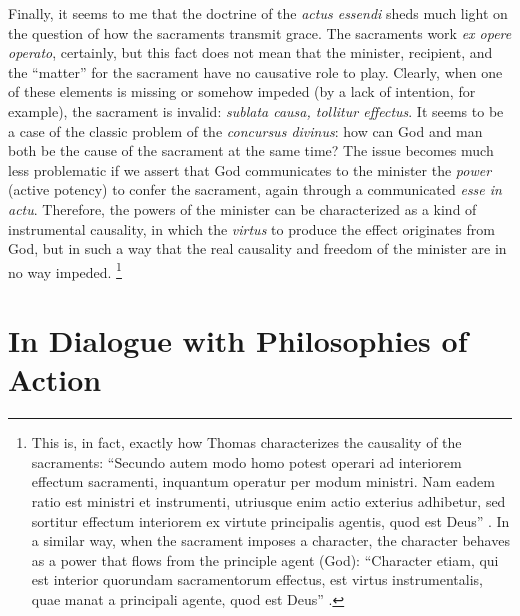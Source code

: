 Finally, it seems to me that the doctrine of the \emph{actus essendi} sheds much light on the question of how the sacraments transmit grace. The sacraments work \emph{ex opere operato}, certainly, but this fact does not mean that the minister, recipient, and the ``matter'' for the sacrament have no causative role to play. Clearly, when one of these elements is missing or somehow impeded (by a lack of intention, for example), the sacrament is invalid: \emph{sublata causa, tollitur effectus}. It seems to be a case of the classic problem of the \emph{concursus divinus}: how can God and man both be the cause of the sacrament at the same time? The issue becomes much less problematic if we assert that God communicates to the minister the \emph{power} (active potency) to confer the sacrament, again through a communicated \emph{esse in actu}. Therefore, the powers of the minister can be characterized as a kind of instrumental causality, in which the \emph{virtus} to produce the effect originates from God, but in such a way that the real causality and freedom of the minister are in no way impeded.%
%
\footnote{This is, in fact, exactly how Thomas characterizes the causality of the sacraments: ``Secundo autem modo homo potest operari ad interiorem effectum sacramenti, inquantum operatur per modum ministri. Nam eadem ratio est ministri et instrumenti, utriusque enim actio exterius adhibetur, sed sortitur effectum interiorem ex virtute principalis agentis, quod est Deus'' \parencite[III, q.~64, a.~1, co.]{st:summa}. In a similar way, when the sacrament imposes a character, the character behaves as a power that flows from the principle agent (God): ``Character etiam, qui est interior quorundam sacramentorum effectus, est virtus instrumentalis, quae manat a principali agente, quod est Deus'' \parencite[III, q.~64, a.~1, co.]{st:summa}.}
%


\section{In Dialogue with Philosophies of Action}

